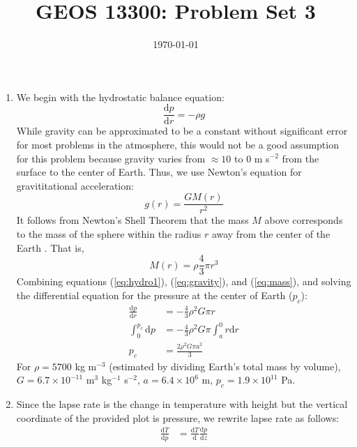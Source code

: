 \documentclass{article}
\title{GEOS 13300: Problem Set 3}
\date{\today}
\begin{document}
\maketitle

\begin{enumerate}

    \item
    We begin with the hydrostatic balance equation:
    \begin{equation}\label{eq:hydro1}
        \frac{\mathrm{d}p}{\mathrm{d}r} = -\rho g
    \end{equation}
    While gravity can be approximated to be a constant without significant error for most problems in the atmosphere, this would not be a good assumption for this problem because gravity varies from $\approx 10$ to 0 m s$^{-2}$ from the surface to the center of Earth. Thus, we use Newton's equation for gravititational acceleration:
    \begin{equation}\label{eq:gravity}
        g(r) = \frac{GM(r)}{r^2}
    \end{equation}
    It follows from Newton's Shell Theorem that the mass $M$ above corresponds to the mass of the sphere within the radius $r$ away from the center of the Earth \citep{borghi2014}. That is,
    \begin{equation}\label{eq:mass}
        M(r) = \rho \frac{4}{3}\pi r^3
    \end{equation}
    Combining equations (\ref{eq:hydro1}), (\ref{eq:gravity}), and (\ref{eq:mass}), and solving the differential equation for the pressure at the center of Earth ($p_c$):
    \begin{align}\label{eq:hydro2}
        \frac{\mathrm{d}p}{\mathrm{d}r} &= -\frac{4}{3}\rho^2 G \pi r \\
        \int_{0}^{p_c} \mathrm{d}p &= -\frac{4}{3}\rho^2 G \pi \int_{a}^{0} r \mathrm{d}r \\
        p_c &= \frac{2 \rho^2 G \pi a^2}{3}
    \end{align}
    For $\rho = 5700$ kg m$^{-3}$ (estimated by dividing Earth's total mass by volume), $G = 6.7\times 10^{-11}$ m$^{3}$ kg$^{-1}$ s$^{-2}$, $a = 6.4\times 10^6$ m, $p_c = 1.9\times 10^{11}$ Pa.

    \item
    Since the lapse rate is the change in temperature with height but the vertical coordinate of the provided plot is pressure, we rewrite lapse rate as follows:
    \begin{align}
        \frac{\mathrm{d}T}{\mathrm{d}p} &= \frac{\mathrm{d}T}{\mathrm{d}} \frac{\mathrm{d}p}{\mathrm{d}z}
    \end{align}
    
\end{enumerate}



\end{document}
